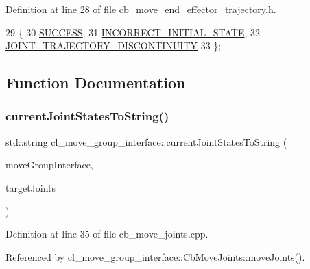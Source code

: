 Definition at line 28 of file cb\+\_\+move\+\_\+end\+\_\+effector\+\_\+trajectory.\+h.


\begin{DoxyCode}
29   \{
30     \hyperlink{classSUCCESS}{SUCCESS},
31     \hyperlink{namespacecl__move__group__interface_ae5fc1caf9a16ae5ad1c97c2e137a7017a1b748367c8d468cb9b65ecd6b2eab32c}{INCORRECT\_INITIAL\_STATE},
32     \hyperlink{namespacecl__move__group__interface_ae5fc1caf9a16ae5ad1c97c2e137a7017a3e86842785cd7c42003e516418347c8e}{JOINT\_TRAJECTORY\_DISCONTINUITY}
33   \};
\end{DoxyCode}


\subsection{Function Documentation}
\mbox{\label{namespacecl__move__group__interface_aad71400738b3e25d9fa9ac924670de5d}} 
\subsubsection{\texorpdfstring{current\+Joint\+States\+To\+String()}{currentJointStatesToString()}}
{\footnotesize\ttfamily std\+::string cl\+\_\+move\+\_\+group\+\_\+interface\+::current\+Joint\+States\+To\+String (\begin{DoxyParamCaption}\item[{moveit\+::planning\+\_\+interface\+::\+Move\+Group\+Interface \&}]{move\+Group\+Interface,  }\item[{std\+::map$<$ std\+::string, double $>$ \&}]{target\+Joints }\end{DoxyParamCaption})}



Definition at line 35 of file cb\+\_\+move\+\_\+joints.\+cpp.



Referenced by cl\+\_\+move\+\_\+group\+\_\+interface\+::\+Cb\+Move\+Joints\+::move\+Joints().



